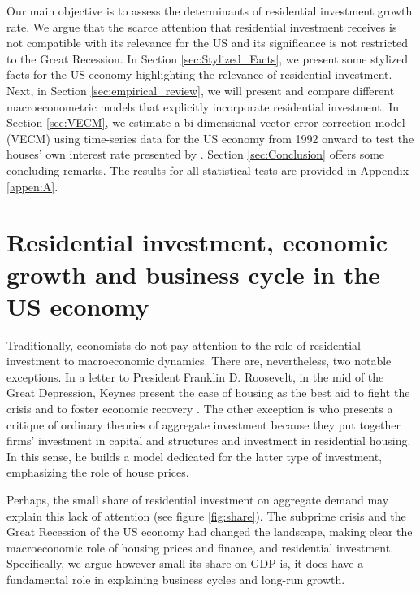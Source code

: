 \documentclass[12pt, a4paper]{article}
\begin{document}
Our main objective is to assess the determinants of residential investment growth rate.
We argue that the scarce attention that residential investment receives is not compatible with its relevance for the US and its significance is not restricted to the Great Recession.
In Section \ref{sec:Stylized_Facts}, we present some stylized facts for the US economy highlighting the relevance of residential investment.
Next, in Section \ref{sec:empirical_review}, we will present and compare different macroeconometric models that explicitly incorporate residential investment.
In Section \ref{sec:VECM}, we estimate a bi-dimensional vector error-correction model (VECM) using time-series data for the US economy from 1992 onward to test the houses' own interest rate presented by \textcite{teixeira_crescimento_2015}. 
Section \ref{sec:Conclusion} offers some concluding remarks.
The results for all statistical tests are provided in Appendix \ref{appen:A}.



\section{Residential investment, economic growth and business cycle in the US economy}
\label{sec:org30d077e}
\label{sec:Stylized_Facts}
Traditionally, economists do not pay attention to the role of residential investment to macroeconomic dynamics.
There are, nevertheless, two notable exceptions.
In a letter to President Franklin D. Roosevelt, in the mid of the Great Depression, Keynes present the case of housing as the best aid to fight the crisis and to foster economic recovery \cite[p.~436]{keynes_collected_1978}.
The other exception is \textcite{duesenberry_investment_1958} who presents a critique of ordinary theories of aggregate investment because they put together firms’ investment in capital and structures and investment in residential housing.
In this sense, he builds a model dedicated for the latter type of investment, emphasizing the role of house prices.

Perhaps, the small share of residential investment on aggregate demand may explain this lack of attention (see figure \ref{fig:share}).
The subprime crisis and the Great Recession of the US economy had changed the landscape, making clear the macroeconomic role of
housing prices and finance, and residential investment.
Specifically, we argue however small its share on GDP is, it does have a fundamental role in explaining business cycles and long-run growth.
\end{document}
